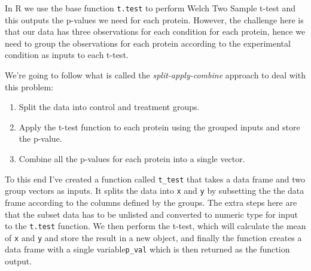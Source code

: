\documentclass[12pt,]{book}
\newenvironment{Shaded}{\begin{snugshade}}{\end{snugshade}}
\newcommand{\KeywordTok}[1]{\textcolor[rgb]{0.13,0.29,0.53}{\textbf{#1}}}
\newcommand{\DataTypeTok}[1]{\textcolor[rgb]{0.13,0.29,0.53}{#1}}
\newcommand{\StringTok}[1]{\textcolor[rgb]{0.31,0.60,0.02}{#1}}
\newcommand{\CommentTok}[1]{\textcolor[rgb]{0.56,0.35,0.01}{\textit{#1}}}
\newcommand{\ControlFlowTok}[1]{\textcolor[rgb]{0.13,0.29,0.53}{\textbf{#1}}}
\newcommand{\OperatorTok}[1]{\textcolor[rgb]{0.81,0.36,0.00}{\textbf{#1}}}
\newcommand{\NormalTok}[1]{#1}
\providecommand{\tightlist}{%
  \setlength{\itemsep}{0pt}\setlength{\parskip}{0pt}}
\theoremstyle{definition}
\theoremstyle{definition}
\theoremstyle{definition}
\theoremstyle{remark}
\begin{document}
In R we use the base function \texttt{t.test} to perform Welch Two
Sample t-test and this outputs the p-values we need for each protein.
However, the challenge here is that our data has three observations for
each condition for each protein, hence we need to group the observations
for each protein according to the experimental condition as inputs to
each t-test.

We're going to follow what is called the \emph{split-apply-combine}
approach to deal with this problem:

\begin{enumerate}
\def\labelenumi{\arabic{enumi}.}
\tightlist
\item
  Split the data into control and treatment groups.
\item
  Apply the t-test function to each protein using the grouped inputs and
  store the p-value.
\item
  Combine all the p-values for each protein into a single vector.
\end{enumerate}

To this end I've created a function called \texttt{t\_test} that takes a
data frame and two group vectors as inputs. It splits the data into
\texttt{x} and \texttt{y} by subsetting the the data frame according to
the columns defined by the groups. The extra steps here are that the
subset data has to be unlisted and converted to numeric type for input
to the \texttt{t.test} function. We then perform the t-test, which will
calculate the mean of \texttt{x} and \texttt{y} and store the result in
a new object, and finally the function creates a data frame with a
single variable\texttt{p\_val} which is then returned as the function
output.

\begin{Shaded}
\end{Shaded}
\end{document}
